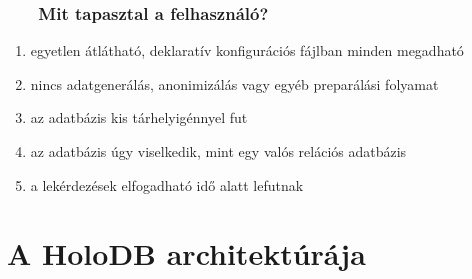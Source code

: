 \documentclass[
]{beamer}
\newcommand{\slidetitle}[2]{\frametitle{{\small #1 ~ \ding{226} ~ } \normalsize \textbf{#2} }}
\begin{document}
\begin{frame}
    \slidetitle{\sectionshorttitle}{Mit tapasztal a felhasználó?}
    
    \begin{enumerate}
        \setlength\itemsep{1em}
        \item egyetlen átlátható, deklaratív {\color{red}konfigurációs fájl}ban minden megadható
        \item {\color{red}nincs adatgenerálás}, anonimizálás vagy egyéb preparálási folyamat
        \item az adatbázis {\color{red}kis tárhelyigénnyel} fut
        \item az adatbázis úgy viselkedik, {\color{red}mint egy valós} relációs adatbázis
        \item a lekérdezések {\color{red}elfogadható idő} alatt lefutnak
    \end{enumerate}
\end{frame}

\section{A HoloDB architektúrája}
\def\sectionshorttitle{Architektúra}
\end{document}
